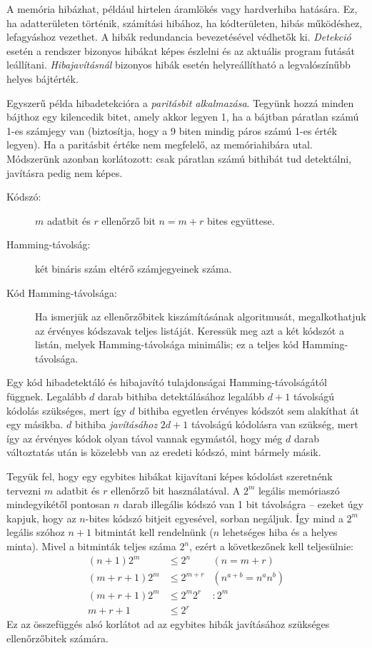 \documentclass[10pt]{article}
\begin{document}
A memória hibázhat, például hirtelen áramlökés vagy hardverhiba hatására. Ez, ha adatterületen történik, számítási hibához, ha kódterületen, hibás működéshez, lefagyáshoz vezethet. A hibák redundancia bevezetésével védhetők ki. \emph{Detekció} esetén a rendszer bizonyos hibákat képes észlelni és az aktuális program futását leállítani. \emph{Hibajavításnál} bizonyos hibák esetén helyreállítható a legvalószínűbb helyes bájtérték.

Egyszerű példa hibadetekcióra a \emph{paritásbit alkalmazása}. Tegyünk hozzá minden bájthoz egy kilencedik bitet, amely akkor legyen 1, ha a bájtban páratlan számú 1-es számjegy van (biztosítja, hogy a 9 biten mindig páros számú 1-es érték legyen). Ha a paritásbit értéke nem megfelelő, az memóriahibára utal. Módszerünk azonban korlátozott: csak páratlan számú bithibát tud detektálni, javításra pedig nem képes.

\begin{description}
	\item[Kódszó:] $m$ adatbit és $r$ ellenőrző bit $n=m+r$ bites együttese.
	\item[Hamming-távolság:] két bináris szám eltérő számjegyeinek száma.
	\item[Kód Hamming-távolsága:] Ha ismerjük az ellenőrzőbitek kiszámításának algoritmusát, megalkothatjuk az érvényes kódszavak teljes listáját. Keressük meg azt a két kódszót a listán, melyek Hamming-távolsága minimális; ez a teljes kód Hamming-távolsága.
\end{description}

Egy kód hibadetektáló és hibajavító tulajdonságai Hamming-távolságától függnek. Legalább $d$ darab bithiba detektálásához legalább $d+1$ távolságú kódolás szükséges, mert így $d$ bithiba egyetlen érvényes kódszót sem alakíthat át egy másikba. $d$ bithiba \emph{javításához} $2d+1$ távolságú kódolásra van szükség, mert így az érvényes kódok olyan távol vannak egymástól, hogy még $d$ darab változtatás után is közelebb van az eredeti kódszó, mint bármely másik.

Tegyük fel, hogy egy egybites hibákat kijavítani képes kódolást szeretnénk tervezni $m$ adatbit és $r$ ellenőrző bit használatával. A $2^m$ legális memóriaszó mindegyikétől pontosan $n$ darab illegális kódszó van 1 bit távolságra -- ezeket úgy kapjuk, hogy az $n$-bites kódszó bitjeit egyesével, sorban negáljuk. Így mind a $2^m$ legális szóhoz $n+1$ bitmintát kell rendelnünk ($n$ lehetséges hiba és a helyes minta). Mivel a bitminták teljes száma $2^n$, ezért a következőnek kell teljesülnie:
\begin{align*}
	(n + 1)2^m     & \leq 2^n     & (n = m + r)         \\
	(m + r + 1)2^m & \leq 2^{m+r} & (n^{a+b} = n^a n^b) \\
	(m + r + 1)2^m & \leq 2^m 2^r & : 2^m               \\
	m + r + 1      & \leq 2^r
\end{align*}
Ez az összefüggés alsó korlátot ad az egybites hibák javításához szükséges ellenőrzőbitek számára.
\end{document}
